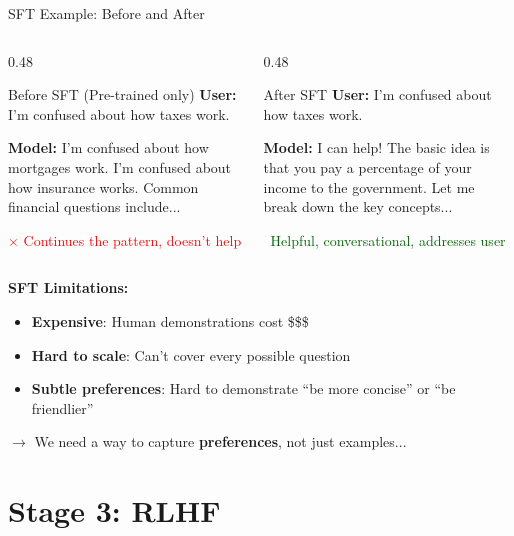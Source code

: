 \documentclass[aspectratio=169,11pt]{beamer}
\newcommand{\highlight}[1]{\textcolor{accentorange}{\textbf{#1}}}
\newcommand{\important}[1]{\textcolor{primaryblue}{\textbf{#1}}}
\begin{document}
\begin{frame}{SFT Example: Before and After}
\begin{columns}[T]
\begin{column}{0.48\textwidth}
\begin{block}{Before SFT (Pre-trained only)}
\textbf{User:} I'm confused about how taxes work.

\textbf{Model:} I'm confused about how mortgages work. I'm confused about how insurance works. Common financial questions include...

\vspace{0.15cm}
{\small \textcolor{red}{$\times$ Continues the pattern, doesn't help}}
\end{block}
\end{column}
\begin{column}{0.48\textwidth}
\begin{block}{After SFT}
\textbf{User:} I'm confused about how taxes work.

\textbf{Model:} I can help! The basic idea is that you pay a percentage of your income to the government. Let me break down the key concepts...

\vspace{0.15cm}
{\small \textcolor{darkgreen}{\checkmark\ Helpful, conversational, addresses user}}
\end{block}
\end{column}
\end{columns}

\vspace{0.4cm}
\textbf{SFT Limitations:}
\begin{itemize}
    \item \important{Expensive}: Human demonstrations cost \$\$\$
    \item \important{Hard to scale}: Can't cover every possible question
    \item \important{Subtle preferences}: Hard to demonstrate ``be more concise'' or ``be friendlier''
\end{itemize}

\vspace{0.2cm}
$\rightarrow$ We need a way to capture \highlight{preferences}, not just examples...
\end{frame}

\section{Stage 3: RLHF}
\end{document}
